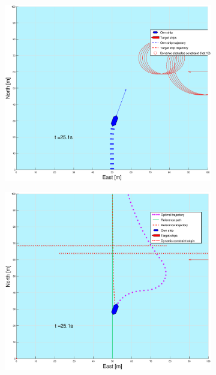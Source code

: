 \begin{figure}[!b]
\begin{subfigure}[b]{0.499\textwidth}
    \end{subfigure}
    \hfill
    \\
    \begin{subfigure}[b]{0.49\textwidth}
        \centering
        \includegraphics[width=\textwidth]{Images/Figures/enkel_GW/_Simple_1fig1_time=25}
    \end{subfigure}
    \hfill
    \begin{subfigure}[b]{0.499\textwidth}
        \centering
        \includegraphics[width=\textwidth]{Images/Figures/enkel_GW/_Simple_1fig999_time=25}
    \end{subfigure}
    \hfill
\end{figure}%
